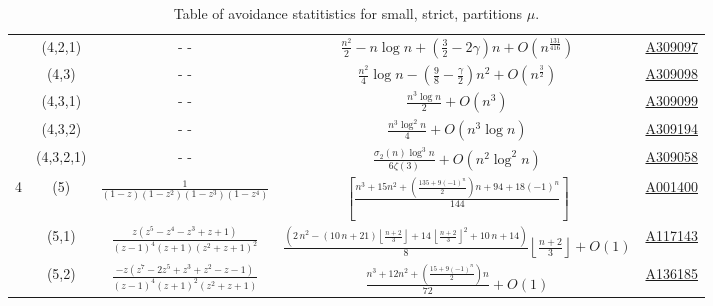 \documentclass{article}
\theoremstyle{plain}
\theoremstyle{definition}
\begin{document}
\begin{table}[!h]
\begin{tabular}{|c|c|c|c|c|}
          &  (4,2,1) & - - & $\frac{n^2}{2} {-} n\log n{+}\left(\frac{3}{2}{-}2\gamma\right)n {+}O\left(n^{\frac{131}{416}}\right)$ & \href{http://oeis.org/A309097}{A309097}\\
          &  (4,3) & - -& $\frac{n^2}{4} \log n-\left(\frac{9}{8} -\frac{\gamma}{2}\right)n^2 +O\left(n^{\frac{3}{2}}\right)$ &\href{http://oeis.org/A309098}{A309098}\\
          &  (4,3,1) & - - & $\frac{n^3 \log n}{2} +O(n^3)$& \href{http://oeis.org/A309099}{A309099}\\
          &  (4,3,2) & - -& $\frac{n^3 \log ^2 n}{4} + O(n^3 \log n)$&  \href{http://oeis.org/A309194}{A309194}\\
          &  (4,3,2,1) & - - & $\frac{\sigma_2(n)\log^3 n}{6\zeta(3)} + O\left(n^2\log^2 n\right)$ & \href{http://oeis.org/A309058}{A309058} \\ 
          4 & (5) & $\frac{1}{(1-z)(1-z^2)(1-z^3)(1-z^4)}$& $\left[\frac{n^3 + 15n^2 +\left(\frac{135 +9(-1)^n}{2}\right)n  + 94 + 18(-1)^n}{144}\right]$ & \href{http://oeis.org/A001400/}{A001400}\\
           & (5,1) & $\frac{z(z^5-z^4-z^3+z+1)}{(z-1)^4(z+1)(z^2+z+1)^2}$ & $ \frac{\left(2 \, n^{2} - {\left(10 \, n + 21\right)} \left \lfloor \frac{n + 2}{3} \right \rfloor + 14 \, \left \lfloor \frac{n + 2}{3} \right \rfloor^{2} + 10 \, n + 14\right)}{8} \left \lfloor \frac{n + 2}{3} \right \rfloor +O(1)$ & \href{http://oeis.org/A117143}{A117143}\\
          & (5,2) & $\frac{-z(z^7 - 2z^5 + z^3 + z^2 - z - 1)}{(z - 1)^4(z + 1)^2(z^2 + z + 1)}$ & $\frac{n^3 + 12n^2 + \left(\frac{15+ 9(-1)^n}{2}\right)n}{72} + O(1)$ & \href{http://oeis.org/A136185}{A136185} \\
          
           
          \hline
    \end{tabular}
    \caption{Table of avoidance statitistics for small, strict, partitions $\mu$.}
    \label{tab:my_label}
\end{table}

\renewcommand{\biblistfont}{\normalfont\normalsize}


\end{document}
